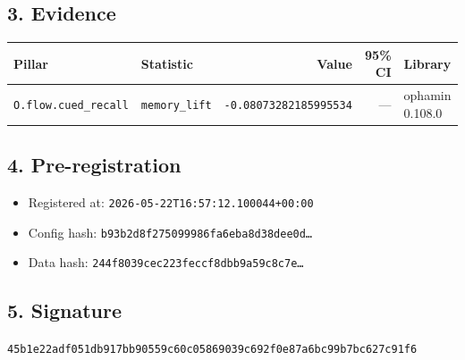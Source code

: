 \documentclass{article}
\begin{document}
\subsection*{3. Evidence}
\begin{tabular}{llrrl}\toprule
\textbf{Pillar} & \textbf{Statistic} & \textbf{Value} & \textbf{95\% CI} & \textbf{Library} \\\midrule
\texttt{O.flow.cued\_recall} & \texttt{memory\_lift} & \texttt{-0.08073282185995534} & --- & ophamin 0.108.0 \\
\bottomrule\end{tabular}
\subsection*{4. Pre-registration}
\begin{itemize}
\item Registered at: \texttt{2026-05-22T16:57:12.100044+00:00}
\item Config hash: \texttt{b93b2d8f275099986fa6eba8d38dee0d\dots}
\item Data hash: \texttt{244f8039cec223feccf8dbb9a59c8c7e\dots}
\end{itemize}
\subsection*{5. Signature}
\texttt{45b1e22adf051db917bb90559c60c05869039c692f0e87a6bc99b7bc627c91f6}\\
\end{document}
